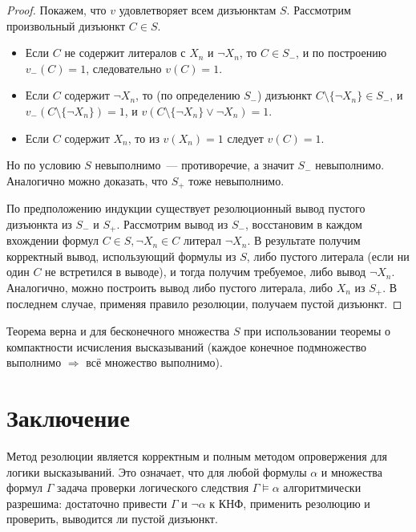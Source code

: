 \documentclass[10pt]{article}
\begin{document}
\begin{proof}
Покажем, что \(v\) удовлетворяет всем дизъюнктам \(S\). Рассмотрим произвольный дизъюнкт \(C \in S\).
\begin{itemize}
\item Если \(C\) не содержит литералов с \(X_n\) и \(\neg X_n\), то \(C \in S_-\), и по построению \(v_-(C) = 1\), следовательно \(v(C)=1\).
\item Если \(C\) содержит \(\neg X_n\), то (по определению \(S_-\)) дизъюнкт \(C \setminus \{\neg X_n\} \in S_-\), и \(v_-(C \setminus \{\neg X_n\}) = 1\), и \(v(C \setminus \{\neg X_n\} \lor \neg X_n)=1\).
\item Если \(C\) содержит \(X_n\), то из \(v(X_n) = 1\) следует \(v(C) = 1\).
\end{itemize}

Но по условию $S$ невыполнимо~--- противоречие, а значит \(S_-\) невыполнимо. Аналогично можно доказать, что $S_+$ тоже невыполнимо.

По предположению индукции существует резолюционный вывод пустого дизъюнкта из $S_-$ и $S_+$. Рассмотрим вывод из $S_-$, восстановим в каждом вхождении формул $C \in S, \neg X_n \in C$ литерал $\neg X_n$. В результате получим корректный вывод, использующий формулы из $S$, либо пустого литерала (если ни один $C$ не встретился в выводе), и тогда получим требуемое, либо вывод $\neg X_n$. Аналогично, можно построить вывод либо пустого литерала, либо $X_n$ из $S_+$. В последнем случае, применяя правило резолюции, получаем пустой дизъюнкт.
\end{proof}

\begin{remark}
Теорема верна и для бесконечного множества $S$ при использовании теоремы о компактности исчисления высказываний (каждое конечное подмножество выполнимо $\Rightarrow$ всё множество выполнимо).
\end{remark}

\section*{Заключение}
Метод резолюции является корректным и полным методом опровержения для логики высказываний. Это означает, что для любой формулы \(\alpha\) и множества формул \(\Gamma\) задача проверки логического следствия \(\Gamma \models \alpha\) алгоритмически разрешима: достаточно привести \(\Gamma\) и \(\neg\alpha\) к КНФ, применить резолюцию и проверить, выводится ли пустой дизъюнкт.
\end{document}
